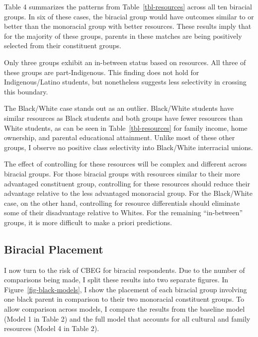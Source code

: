 \documentclass[
  letterpaper,
  DIV=11,
  numbers=noendperiod]{scrartcl}
\begin{document}
Table 4 summarizes the patterns from Table~\ref{tbl-resources} across
all ten biracial groups. In six of these cases, the biracial group would
have outcomes similar to or better than the monoracial group with better
resources. These results imply that for the majority of these groups,
parents in these matches are being positively selected from their
constituent groups.

Only three groups exhibit an in-between status based on resources. All
three of these groups are part-Indigenous. This finding does not hold
for Indigenous/Latino students, but nonetheless suggests less
selectivity in crossing this boundary.

The Black/White case stands out as an outlier. Black/White students have
similar resources as Black students and both groups have fewer resources
than White students, as can be seen in Table~\ref{tbl-resources} for
family income, home ownership, and parental educational attainment.
Unlike most of these other groups, I observe no positive class
selectivity into Black/White interracial unions.

The effect of controlling for these resources will be complex and
different across biracial groups. For those biracial groups with
resources similar to their more advantaged constituent group,
controlling for these resources should reduce their advantage relative
to the less advantaged monoracial group. For the Black/White case, on
the other hand, controlling for resource differentials should eliminate
some of their disadvantage relative to Whites. For the remaining
``in-between'' groups, it is more difficult to make a priori
predictions.

\hypertarget{biracial-placement}{%
\subsection{Biracial Placement}\label{biracial-placement}}

I now turn to the risk of CBEG for biracial respondents. Due to the
number of comparisons being made, I split these results into two
separate figures. In Figure~\ref{fig-black-models}, I show the placement
of each biracial group involving one black parent in comparison to their
two monoracial constituent groups. To allow comparison across models, I
compare the results from the baseline model (Model 1 in Table 2) and the
full model that accounts for all cultural and family resources (Model 4
in Table 2).
\end{document}
